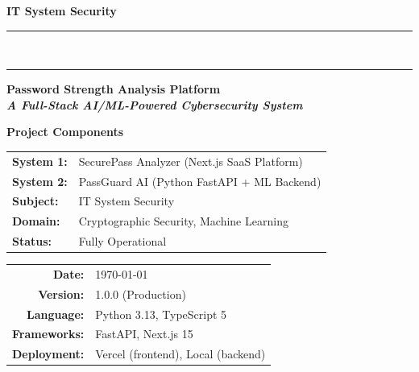 \documentclass[12pt,a4paper]{article}
\begin{document}
\begin{titlepage}
    \centering
    \vspace*{1cm}

    {\huge\bfseries\color{sectioncolor}
    IT System Security\\[0.4em]
    }

    \noindent\rule{\linewidth}{1.5pt}\\[0.3em]
    \noindent\rule{\linewidth}{0.4pt}

    \vspace{1.2cm}

    {\LARGE\bfseries
    Password Strength Analysis Platform\\[0.3em]
    \large\textit{A Full-Stack AI/ML-Powered Cybersecurity System}
    }

    \vspace{1.5cm}

    \begin{tcolorbox}[
        colback=sectioncolor!6,
        colframe=sectioncolor!30,
        width=0.85\linewidth,
        boxrule=0.5pt,
        arc=6pt
    ]
    \centering
    \textbf{Project Components}\\[0.5em]
    \begin{tabular}{ll}
        \textbf{System 1:} & SecurePass Analyzer (Next.js SaaS Platform) \\
        \textbf{System 2:} & PassGuard AI (Python FastAPI + ML Backend) \\
        \textbf{Subject:}  & IT System Security \\
        \textbf{Domain:}   & Cryptographic Security, Machine Learning \\
        \textbf{Status:}   & Fully Operational \\
    \end{tabular}
    \end{tcolorbox}

    \vspace{1.5cm}

    {\large
    \begin{tabular}{rl}
        \textbf{Date:}         & \today \\[0.3em]
        \textbf{Version:}      & 1.0.0 (Production) \\[0.3em]
        \textbf{Language:}     & Python 3.13, TypeScript 5 \\[0.3em]
        \textbf{Frameworks:}   & FastAPI, Next.js 15 \\[0.3em]
        \textbf{Deployment:}   & Vercel (frontend), Local (backend) \\
    \end{tabular}
    }


\end{titlepage}
\end{document}
